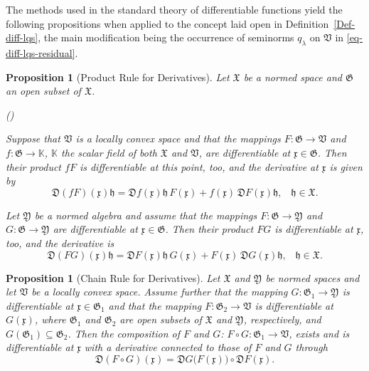 \documentclass[11pt,twoside,openright]{report}
\theoremstyle{definition}
\theoremstyle{plain}
\newtheorem{Pro}[Def]{Proposition}
\theoremstyle{remark}
\theoremstyle{assumption}
\newcommand{\ql}{q_\lambda}
\newcommand{\Kbb}{\mathbb{K}}
\newcommand{\Dfrak}{\mathfrak{D}}
\newcommand{\Gfrak}{\mathfrak{G}}
\newcommand{\Vfrak}{\mathfrak{V}}
\newcommand{\Xfrak}{\mathfrak{X}}
\newcommand{\Yfrak}{\mathfrak{Y}}
\newcommand{\hfrak}{\mathfrak{h}}
\newcommand{\xfrak}{\mathfrak{x}}
\newcounter{propitem}
\newenvironment{proplist}{\begin{list}{(\roman{propitem})}%
  {\usecounter{propitem} \setlength{\topsep}{0ex}%
   \setlength{\parsep}{0.2ex} \setlength{\itemsep}{0.4ex}%
   \setlength{\leftmargin}{0em} \setlength{\itemindent}{0.5em}%
   }}{\end{list}}
\begin{document}
The methods used in the standard theory of differentiable functions
yield the following propositions when applied to the concept laid open
in Definition~\ref{Def-diff-lqs}, the main modification being the
occurrence of seminorms $\ql$ on $\Vfrak$ in
\eqref{eq-diff-lqs-residual}. 
\begin{Pro}[Product Rule for Derivatives]
  \label{Pro-product-rule}
  Let $\Xfrak$ be a normed space and $\Gfrak$ an open subset of
  $\Xfrak$.
  \begin{proplist}
  \item Suppose that $\Vfrak$ is a locally convex space and that the
    mappings $F : \Gfrak \rightarrow \Vfrak$ and $f : \Gfrak
    \rightarrow \Kbb$, $\Kbb$ the scalar field of both $\Xfrak$ and
    $\Vfrak$, are differentiable at $\xfrak \in \Gfrak$. Then their 
    product $f F$ is differentiable at this point, too, and the
    derivative at $\xfrak$ is given by
    \begin{equation*}
      \Dfrak ( f F ) ( \xfrak ) \hfrak = \Dfrak f ( \xfrak ) \hfrak \,
      F ( \xfrak ) + f ( \xfrak ) \, \Dfrak F ( \xfrak ) \hfrak
      \text{,} \quad \hfrak \in \Xfrak \text{.}
    \end{equation*}
  \item Let $\Yfrak$ be a normed algebra and assume that the mappings
    $F : \Gfrak \rightarrow \Yfrak$ and $G : \Gfrak \rightarrow
    \Yfrak$ are differentiable at $\xfrak \in \Gfrak$. Then their 
    product $F G$ is differentiable at $\xfrak$, too, and the
    derivative is
    \begin{equation*}
      \Dfrak ( F G ) ( \xfrak ) \hfrak = \Dfrak F ( \xfrak ) \hfrak \,
      G ( \xfrak ) + F ( \xfrak ) \, \Dfrak G ( \xfrak ) \hfrak
      \text{,} \quad \hfrak \in \Xfrak \text{.}
    \end{equation*}
  \end{proplist}
\end{Pro}
\begin{Pro}[Chain Rule for Derivatives]
  \label{Pro-chain-rule}
  Let $\Xfrak$ and $\Yfrak$ be normed spaces and let $\Vfrak$ be a
  locally convex space. Assume further that the mapping $G : \Gfrak_1
  \rightarrow \Yfrak$ is differentiable at $\xfrak \in \Gfrak_1$ and
  that the mapping $F : \Gfrak_2 \rightarrow \Vfrak$ is differentiable
  at $G ( \xfrak )$, where $\Gfrak_1$ and $\Gfrak_2$ are open subsets
  of $\Xfrak$ and $\Yfrak$, respectively, and $G ( \Gfrak_1 )
  \subseteq \Gfrak_2$. Then the composition of $F$ and $G$: $F \circ G
  : \Gfrak_1 \rightarrow \Vfrak$, exists and is differentiable at
  $\xfrak$ with a derivative connected to those of $F$ and $G$ through
  \begin{equation*}
    \Dfrak ( F \circ G ) ( \xfrak ) = \Dfrak G \bigl( F ( \xfrak )
    \bigr) \circ \Dfrak F ( \xfrak ) \text{.}
  \end{equation*}
\end{Pro}
\end{document}
